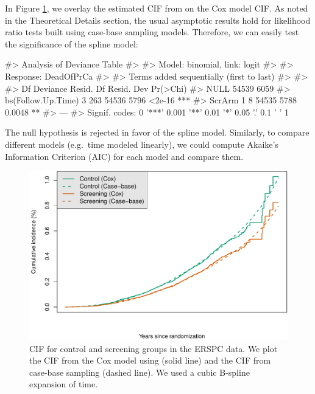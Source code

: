 In Figure \ref{fig:erspc-cox-cif}, we overlay the estimated CIF from
 on the Cox model CIF. As noted in the Theoretical Details
section, the usual asymptotic results hold for likelihood ratio tests
built using case-base sampling models. Therefore, we can easily test the
significance of the spline model:

\begin{Schunk}
\begin{Soutput}
#> Analysis of Deviance Table
#> 
#> Model: binomial, link: logit
#> 
#> Response: DeadOfPrCa
#> 
#> Terms added sequentially (first to last)
#> 
#> 
#>                    Df Deviance Resid. Df Resid. Dev Pr(>Chi)    
#> NULL                               54539       6059             
#> bs(Follow.Up.Time)  3      263     54536       5796   <2e-16 ***
#> ScrArm              1        8     54535       5788   0.0048 ** 
#> ---
#> Signif. codes:  0 '***' 0.001 '**' 0.01 '*' 0.05 '.' 0.1 ' ' 1
\end{Soutput}
\end{Schunk}

The null hypothesis is rejected in favor of the spline model. Similarly,
to compare different models (e.g.~time modeled linearly), we could
compute Akaike's Information Criterion (AIC) for each model and compare
them.

\begin{Schunk}
\begin{figure}[ht]
\includegraphics[width=\textwidth,keepaspectratio=true]{./erspc-cox-cif-1} \caption{CIF for control and screening groups in the ERSPC data. We plot the CIF from the Cox model using  (solid line) and the CIF from case-base sampling (dashed line). We used a cubic B-spline expansion of time.}\label{fig:erspc-cox-cif}
\end{figure}
\end{Schunk}


